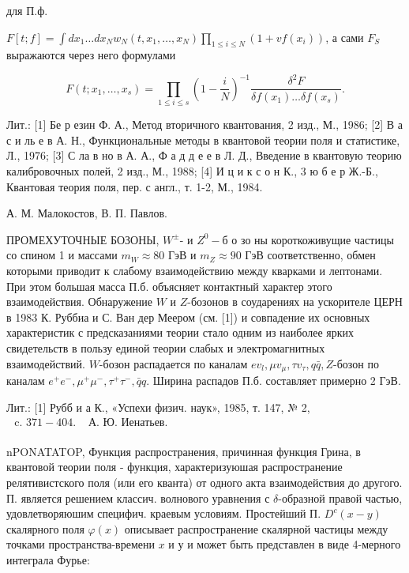\documentclass[10pt]{article}
\begin{document}
для П.ф.



$F[t ; f]=\int d x_{1} \ldots d x_{N} w_{N}\left(t, x_{1}, \ldots, x_{N}\right) \prod_{1 \leqslant i \leqslant N}\left(1+v f\left(x_{i}\right)\right)$, а сами $F_{S}$ выражаются через него формулами



\[

F\left(t ; x_{1}, \ldots, x_{s}\right)=\prod_{1 \leqslant i \leqslant s}\left(1-\frac{i}{N}\right)^{-1} \frac{\delta^{2} F}{\delta f\left(x_{1}\right) \ldots \delta f\left(x_{s}\right)} .

\]



Лит.: [1] Бе р езин Ф. А., Метод вторичного квантования, 2 изд., М., 1986; [2] В а с и ль е в А. Н., Функциональные методы в квантовой теории поля и статистике, Л., 1976; [3] С ла в но в А. А., Ф а д д е е в Л. Д., Введение в квантовую теорию калибровочных полей, 2 изд., М., 1988; [4] И ц и к с о н К., 3 ю б е р Ж.-Б., Квантовая теория поля, пер. с англ., т. 1-2, М., 1984.



А. М. Малокостов, В. П. Павлов.



ПРОМЕХУТОЧНЫЕ БОЗОНЫ, $W^{ \pm}$- и $Z^{0}-б$ о зо ны короткоживущие частицы со спином 1 и массами $m_{W} \approx 80$ ГэВ и $m_{Z} \approx 90$ ГэВ соответственно, обмен которыми приводит к слабому взаимодействию между кварками и лептонами. При этом большая масса П.б. объясняет контактный характер этого взаимодействия. Обнаружение $W$ и $Z$-бозонов в соударениях на ускорителе ЦЕРН в 1983 К. Руббиа и С. Ван дер Меером (см. [1]) и совпадение их основных характеристик с предсказаниями теории стало одним из наиболее ярких свидетельств в пользу единой теории слабых и электромагнитных взаимодействий. $W$-бозон распадается по каналам $e v_{l}, \mu v_{\mu}, \tau v_{\tau}, q \bar{q}, Z$-бозон по каналам $e^{+} e^{-}, \mu^{+} \mu^{-}, \tau^{+} \tau^{-}, \bar{q} q$. Ширина распадов П.б. составляет примерно 2 ГэВ.



Лит.: [1] Рубб и а К., «Успехи физич. наук», 1985, т. 147, № 2, $\begin{array}{ll}\text { c. } 371-404 . & \text { А. Ю. Иенатьев. } \\ & \end{array}$



nPONATATOP, Функция распространения, причинная функция Грина, в квантовой теории поля - функция, характеризуюшая распространение релятивистского поля (или его кванта) от одного акта взаимодействия до другого. П. является решением классич. волнового уравнения с $\delta$-образной правой частью, удовлетворяюшим специфич. краевым условиям. Простейший П. $D^{c}(x-y)$ скалярного поля $\varphi(x)$ описывает распространение скалярной частицы между точками пространства-времени $x$ и $у$ и может быть представлен в виде 4-мерного интеграла Фурье:
\end{document}
